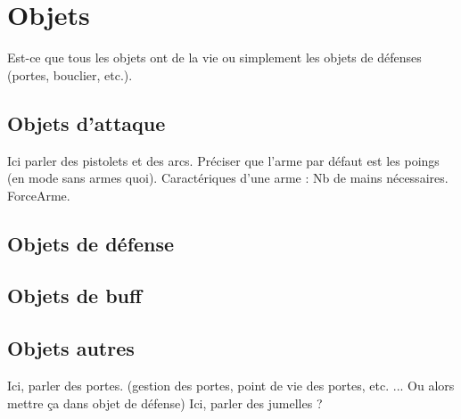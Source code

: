 \section{Objets}
Est-ce que tous les objets ont de la vie ou simplement les objets de défenses (portes, bouclier, etc.).
\subsection{Objets d'attaque}
Ici parler des pistolets et des arcs. Préciser que l'arme par défaut est les poings (en mode sans armes quoi). 
Caractériques d'une arme :
Nb de mains nécessaires.
ForceArme.
\subsection{Objets de défense}
\subsection{Objets de buff}
\subsection{Objets autres}
Ici, parler des portes. (gestion des portes, point de vie des portes, etc. ... Ou alors mettre ça dans objet de défense)
Ici, parler des jumelles ?